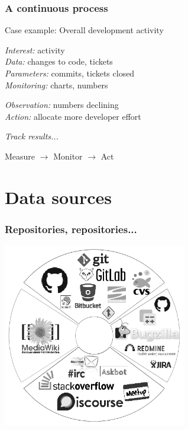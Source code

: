 \documentclass[17pt,aspectratio=169,hyperref=pdfusetitle]{beamer}
\begin{document}
\begin{frame}
\frametitle{A continuous process}

\begin{flushright}
Case example: Overall development activity
\end{flushright}

\emph{Interest:} activity \\
\emph{Data:} changes to code, tickets \\
\emph{Parameters:} commits, tickets closed \\
\emph{Monitoring:} charts, numbers
\begin{flushright}
\emph{Observation:} numbers declining \\
\emph{Action:} allocate more developer effort \\
\end{flushright}
\emph{Track results...} \\
\begin{flushright}
Measure $\rightarrow$ Monitor $\rightarrow$ Act
\end{flushright}
\end{frame}


\section{Data sources}


\begin{frame}
  \frametitle{Repositories, repositories...}

  \begin{center}
    \includegraphics[height=8cm]{figs/data-sources}
  \end{center}
\end{frame}
\end{document}
